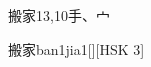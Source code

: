 \begin{entry}{搬家}{13,10}{⼿、⼧}
  \begin{phonetics}{搬家}{ban1jia1}[][HSK 3]
  \end{phonetics}
\end{entry}
